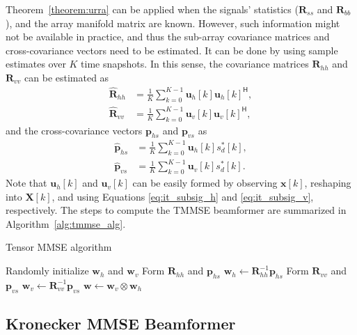 \documentclass{cta-author}
\newcommand{\hermit}{\mathsf{H}}					%
\newcommand{\Rss}{\bm{R}_{ss}}
\newcommand{\Rbb}{\bm{R}_{bb}}
\begin{document}
Theorem~\ref{theorem:urra} can be applied when the signals' statistics ($\Rss$ and $\Rbb$), and the array manifold matrix are known. However, such information might not be available in practice, and thus the sub-array covariance matrices and cross-covariance vectors need to be estimated. It can be done by  using sample estimates over $K$ time snapshots. In this sense,
the covariance matrices $\bm{R}_{hh}$ and $\bm{R}_{vv}$ can be estimated as
\begin{align}
\hat{\bm{R}}_{hh} &= \frac{1}{K} \sum_{k=0}^{K-1} \bm{u}_h[k] \bm{u}_h[k]^\hermit, \label{eq:covh_sample}\\
\hat{\bm{R}}_{vv} &= \frac{1}{K} \sum_{k=0}^{K-1} \bm{u}_v[k] \bm{u}_v[k]^\hermit, \label{eq:crosscorrh_sample}
\end{align}
and the cross-covariance vectors $\bm{p}_{hs}$ and $\bm{p}_{vs}$ as
\begin{align}
\hat{\bm{p}}_{hs} &= \frac{1}{K} \sum_{k=0}^{K-1} \bm{u}_h[k] s_d^*[k], \label{eq:covv_sample}\\
\hat{\bm{p}}_{vs} &=  \frac{1}{K} \sum_{k=0}^{K-1} \bm{u}_v[k] s_d^*[k].  \label{eq:crosscorrv_sample}
\end{align}
Note that $\bm{u}_h[k]$ and $\bm{u}_v[k]$ can be easily formed by observing $\bm{x}[k]$, reshaping into $\bm{X}[k]$, and using Equations \eqref{eq:it_subsig_h} and \eqref{eq:it_subsig_v}, respectively. The steps to compute the TMMSE beamformer are summarized in Algorithm~\ref{alg:tmmse_alg}.

\begin{algorithm}[t]
	\caption{Tensor MMSE algorithm}
	\label{alg:tmmse_alg}
	\begin{algorithmic}[1]
		\State Randomly initialize $\bm{w}_h$ and $\bm{w}_v$
		\Repeat
		\State Form $\bm{R}_{hh}$ and $\bm{p}_{hs}$
		\State $\bm{w}_h \gets \bm{R}_{hh}^{-1} \bm{p}_{hs}$
		\State Form $\bm{R}_{vv}$  and $\bm{p}_{vs}$
		\State $\bm{w}_v \gets \bm{R}_{vv}^{-1} \bm{p}_{vs}$
		\State $\bm{w} \gets \bm{w}_v \otimes \bm{w}_h$
	\end{algorithmic}
\end{algorithm}

\subsection{Kronecker MMSE Beamformer} \label{sec:kmmse}
\end{document}
